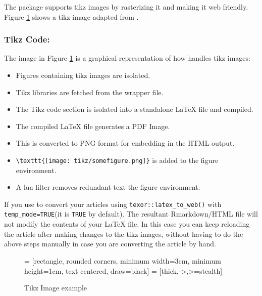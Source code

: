 The  package supports tikz images by rasterizing it and making it web friendly.
Figure \ref{fig:tikz} shows a tikz image adapted from \citep{casflow}.

\subsubsection{Tikz Code:}
The image in Figure  \ref{fig:tikz} is a graphical representation of how  handles tikz images:

\begin{itemize}
\item Figures containing tikz images are isolated.
\item Tikz libraries are fetched from the wrapper file.
\item The Tikz code section is isolated into a standalone LaTeX file and compiled.
\item The compiled LaTeX file generates a PDF Image.
\item This is converted to PNG format for embedding in the HTML output.
\item \verb|\texttt{[image: tikz/somefigure.png]}| is added to the figure environment.
\item A lua filter removes redundant text the figure environment.
\end{itemize}

If you use  to convert your articles using \verb|texor::latex_to_web()| with \verb|temp_mode=TRUE|(it is \verb|TRUE| by default). The resultant Rmarkdown/HTML file will not modify the contents of your LaTeX file. In this case you can keep reloading the article after making changes to the tikz images, without having to do the above steps manually in case you are converting the article by hand.

\begin{figure}

  \centering
{} = [rectangle, rounded corners,
minimum width=3cm, 
minimum height=1cm,
text centered, 
draw=black]
 = [thick,->,>=stealth]
\caption{Tikz Image example}
  \label{fig:tikz}
\end{figure}


